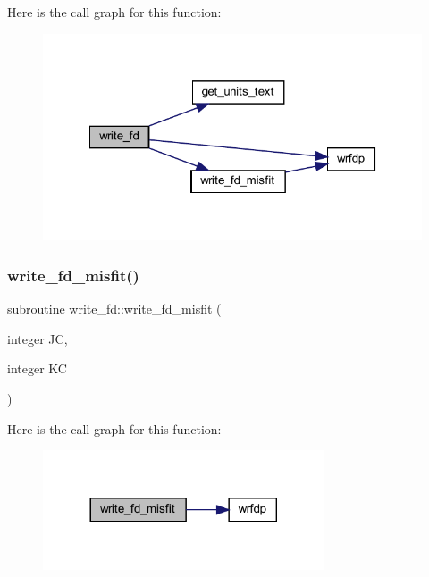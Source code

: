 Here is the call graph for this function\+:\nopagebreak
\begin{figure}[H]
\begin{center}
\leavevmode
\includegraphics[width=322pt]{Leroi__c_8f90_ab3f62aa9d1d60322e81296cc809df15f_cgraph}
\end{center}
\end{figure}
\mbox{\label{Leroi__c_8f90_a099fdc373643714db817e823ef93b622}} 
\subsubsection{\texorpdfstring{write\+\_\+fd\+\_\+misfit()}{write\_fd\_misfit()}}
{\footnotesize\ttfamily subroutine write\+\_\+fd\+::write\+\_\+fd\+\_\+misfit (\begin{DoxyParamCaption}\item[{integer}]{JC,  }\item[{integer}]{KC }\end{DoxyParamCaption})}

Here is the call graph for this function\+:\nopagebreak
\begin{figure}[H]
\begin{center}
\leavevmode
\includegraphics[width=236pt]{Leroi__c_8f90_a099fdc373643714db817e823ef93b622_cgraph}
\end{center}
\end{figure}
\mbox{\label{Leroi__c_8f90_a6e7ea94365af1aa0e4cf97b842e24cf6}} 
